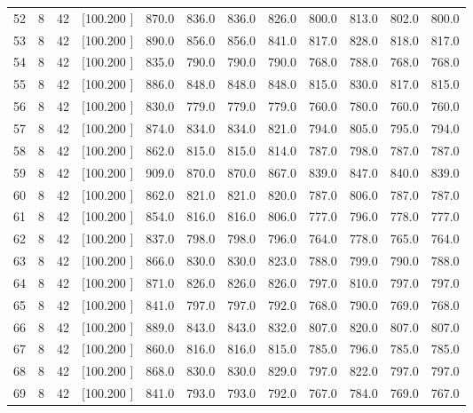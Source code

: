 \documentclass[12pt,a4paper]{article}
\begin{document}
\begin{center}
{\begin{tabular}{r r r r r r r r r r r r}
  52&  8& 42&[100.200   ]&   870.0&   836.0&   836.0&   826.0&   800.0&   813.0&   802.0&   800.0\\[-0.02in]
  53&  8& 42&[100.200   ]&   890.0&   856.0&   856.0&   841.0&   817.0&   828.0&   818.0&   817.0\\[-0.02in]
  54&  8& 42&[100.200   ]&   835.0&   790.0&   790.0&   790.0&   768.0&   788.0&   768.0&   768.0\\[-0.02in]
  55&  8& 42&[100.200   ]&   886.0&   848.0&   848.0&   848.0&   815.0&   830.0&   817.0&   815.0\\[-0.02in]
  56&  8& 42&[100.200   ]&   830.0&   779.0&   779.0&   779.0&   760.0&   780.0&   760.0&   760.0\\[-0.02in]
  57&  8& 42&[100.200   ]&   874.0&   834.0&   834.0&   821.0&   794.0&   805.0&   795.0&   794.0\\[-0.02in]
  58&  8& 42&[100.200   ]&   862.0&   815.0&   815.0&   814.0&   787.0&   798.0&   787.0&   787.0\\[-0.02in]
  59&  8& 42&[100.200   ]&   909.0&   870.0&   870.0&   867.0&   839.0&   847.0&   840.0&   839.0\\[-0.02in]
  60&  8& 42&[100.200   ]&   862.0&   821.0&   821.0&   820.0&   787.0&   806.0&   787.0&   787.0\\[-0.02in]
  61&  8& 42&[100.200   ]&   854.0&   816.0&   816.0&   806.0&   777.0&   796.0&   778.0&   777.0\\[-0.02in]
  62&  8& 42&[100.200   ]&   837.0&   798.0&   798.0&   796.0&   764.0&   778.0&   765.0&   764.0\\[-0.02in]
  63&  8& 42&[100.200   ]&   866.0&   830.0&   830.0&   823.0&   788.0&   799.0&   790.0&   788.0\\[-0.02in]
  64&  8& 42&[100.200   ]&   871.0&   826.0&   826.0&   826.0&   797.0&   810.0&   797.0&   797.0\\[-0.02in]
  65&  8& 42&[100.200   ]&   841.0&   797.0&   797.0&   792.0&   768.0&   790.0&   769.0&   768.0\\[-0.02in]
  66&  8& 42&[100.200   ]&   889.0&   843.0&   843.0&   832.0&   807.0&   820.0&   807.0&   807.0\\[-0.02in]
  67&  8& 42&[100.200   ]&   860.0&   816.0&   816.0&   815.0&   785.0&   796.0&   785.0&   785.0\\[-0.02in]
  68&  8& 42&[100.200   ]&   868.0&   830.0&   830.0&   829.0&   797.0&   822.0&   797.0&   797.0\\[-0.02in]
  69&  8& 42&[100.200   ]&   841.0&   793.0&   793.0&   792.0&   767.0&   784.0&   769.0&   767.0\\[-0.02in]

\end{tabular}}
\end{center}
\end{document}
